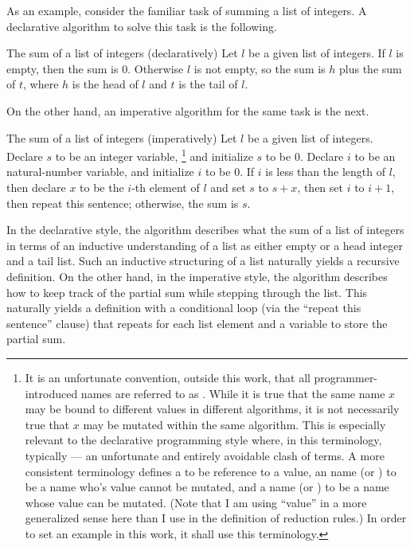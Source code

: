 As an example, consider the familiar task of summing a list of integers.
A declarative algorithm to solve this task is the following.
\begin{descgram}{The sum of a list of integers (declaratively)}
Let $l$ be a given list of integers.
If $l$ is empty, then the sum is $0$.
Otherwise $l$ is not empty, so the sum is $h$ plus the sum of $t$,
where $h$ is the head of $l$ and $t$ is the tail of $l$.
\end{descgram}
%
On the other hand, an imperative algorithm for the same task is the next.
\begin{descgram}{The sum of a list of integers (imperatively)}
Let $l$ be a given list of integers.
Declare $s$ to be an integer variable,%
\footnote{
  It is an unfortunate convention, outside this work, that all programmer-introduced names are referred to as .
  While it is true that the same name $x$ may be bound to different values in different algorithms, it is not necessarily true that $x$ may be mutated within the same algorithm.
  This is especially relevant to the declarative programming style where, in this terminology, typically  --- an unfortunate and entirely avoidable clash of terms.
  A more consistent terminology defines
  a  to be reference to a value,
  an  name (or ) to be a name who's value cannot be mutated, and
  a  name (or ) to be a name whose value can be mutated.
  (Note that I am using ``value'' in a more generalized sense here than I use in the definition of reduction rules.)
  In order to set an example in this work, it shall use this terminology.
}
and initialize $s$ to be $0$.
Declare $i$ to be an natural-number variable, and initialize $i$ to be $0$.
If $i$ is less than the length of $l$, then declare $x$ to be the $i$-th element of $l$ and set $s$ to $s + x$, then set $i$ to $i + 1$, then repeat this sentence;
  otherwise, the sum is $s$.
\end{descgram}
%

In the declarative style, the algorithm describes what the sum of a list of integers in terms of an inductive understanding of a list as either empty or a head integer and a tail list.
Such an inductive structuring of a list naturally yields a recursive definition.
On the other hand, in the imperative style, the algorithm describes how to keep track of the partial sum while stepping through the list.
This naturally yields a definition with a conditional loop (via the ``repeat this sentence'' clause) that repeats for each list element and a variable to store the partial sum.



